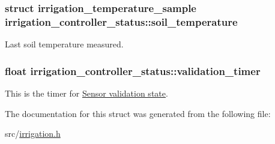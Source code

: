 \hypertarget{structirrigation__controller__status_a3ef3b031a2c91413170ad02626e8da1c}{}
\subsubsection[{soil\+\_\+temperature}]{\setlength{\rightskip}{0pt plus 5cm}struct {\bf irrigation\+\_\+temperature\+\_\+sample} irrigation\+\_\+controller\+\_\+status\+::soil\+\_\+temperature}\label{structirrigation__controller__status_a3ef3b031a2c91413170ad02626e8da1c}


Last soil temperature measured. 

\hypertarget{structirrigation__controller__status_a360e7ee7f6ac54635fc66035883d2d9c}{}
\subsubsection[{validation\+\_\+timer}]{\setlength{\rightskip}{0pt plus 5cm}float irrigation\+\_\+controller\+\_\+status\+::validation\+\_\+timer}\label{structirrigation__controller__status_a360e7ee7f6ac54635fc66035883d2d9c}


This is the timer for \hyperlink{group__state__validate}{Sensor validation state}. 



The documentation for this struct was generated from the following file\+:\begin{DoxyCompactItemize}
\item 
src/\hyperlink{irrigation_8h}{irrigation.\+h}\end{DoxyCompactItemize}
